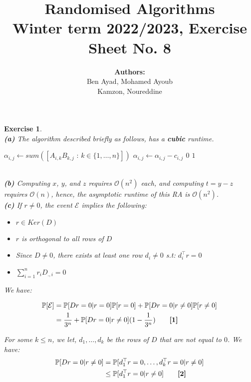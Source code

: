 \documentclass{article}
\title{Randomised Algorithms \\
Winter term 2022/2023, Exercise Sheet No. 8}
\author{
    \textbf{Authors:} \\
    Ben Ayad, Mohamed Ayoub \\
    Kamzon, Noureddine
}
\newtheorem{exo}{Exercise}
\def\P{\mathbb{P}}
\begin{document}
\maketitle

\begin{exo}{\ \\}
\noindent
\textbf{(a)}  The algorithm described briefly as follows, has a \textbf{cubic} runtime.

\begin{algorithmic}[1]
    \State $\alpha_{i,j} \gets sum([A_{i,k}B_{k,j} \text{ : } k \in \{1,\dots ,n\}])$ 
    \State $\alpha_{i,j} \gets \alpha_{i,j} - c_{i,j}$
    \State \Return $0$
\EndIf
\EndFor 
\State \Return $1$
\end{algorithmic}


\noindent
\\\textbf{(b)}  Computing $x$, $y$, and $z$ requires $\mathcal{O}(n^2)$ each, and computing $t = y-z$ requires $\mathcal{O}(n)$, hence, the asymptotic runtime of this RA is $\mathcal{O}(n^2)$.\\

\noindent
\textbf{(c)} If $r \neq 0$, the event $\mathcal{E}$ implies the following:
\begin{itemize}
    \item $r \in Ker(D)$
    \item $r$ is orthogonal to all rows of $D$
    \item Since $D \neq 0$, there exists at least one row $d_i \neq 0$ s.t: $d_i^\top r = 0$
    \item $\sum^{n}_{i=1} r_i D_{.,i} = 0$
\end{itemize}

We have:

\begin{align*}
    \P[\mathcal{E}] 
    &= \P[Dr=0|r=0]\P[r=0] + \P[Dr=0|r\neq0]\P[r\neq0] \\
    &= \frac{1}{3^n} + \P[Dr=0|r\neq0](1-\frac{1}{3^n}) \quad \quad  \text{\textbf{[1]}}
\end{align*}


For some $k\leq n$, we let, $d_1, \dots, d_k$  be the rows of $D$ that are not equal to $0$. We have:
\begin{align*}
    \P[Dr=0|r\neq0]
    &= \P[d_1^\top r = 0, \dots, d_k^\top r = 0 |  r\neq0] \\
    &\leq \P[d_1^\top r = 0 | r\neq0]    \quad \quad  \text{\textbf{[2]}}
\end{align*}


\end{exo}
\end{document}
